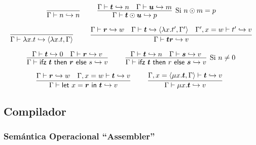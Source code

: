 \documentclass[twoside,a4paper,12pt]{article}
\theoremstyle{definition}
\theoremstyle{remark}
\begin{document}
\begin{equation*}
  \infer[]
    {\Gamma\vdash n \hra n}
    {}
  \qquad
  \infer[\textrm{Si }n\odot m=p]
    {\Gamma\vdash \bm t \odot \bm u \hra p}
    {\Gamma\vdash \bm t \hra n & \Gamma\vdash \bm u \hra m }
\end{equation*}

\begin{equation*}
  \infer[]
    {\Gamma\vdash\fun xt\hra\thunk {\fun xt}\Gamma}
    {}
  \qquad
  \infer
    {\Gamma\vdash \bm{t} \bm{r} \hra v}
    {
      \Gamma\vdash \bm r \hra w
      &\Gamma\vdash \bm t \hra\thunk {\fun x{t'}}{\Gamma'}
      &\Gamma',x=w\vdash t'\hra v
    }
\end{equation*}

\begin{equation*}
  \infer[]
    {\Gamma\vdash \ifz{\bm t}{\bm r}{s}\hra v}
    {
      \Gamma\vdash  \bm t \hra 0
      &\Gamma\vdash \bm r \hra v
    }
    \qquad
    \infer[\textrm{Si }n\neq 0]
      {\Gamma\vdash \ifz{\bm t}{r}{\bm s} \hra v}
      {
        \Gamma\vdash  \bm t \hra n
        &\Gamma\vdash \bm s \hra v
      }
\end{equation*}

\begin{equation*}
  \infer[]
    {\Gamma\vdash\letl{x}{\bm r}{\bm t} \hra v}
    {
      \Gamma\vdash \bm r \hra w
      &\Gamma,x=w\vdash \bm t \hra v
    }
    \qquad
    \infer[]
      {\Gamma \vdash \fix x{\bm t} \hra v}
      {\Gamma,x=\thunk{\fix x{\bm t}}\Gamma\vdash \bm t \hra v}
\end{equation*}

\newpage
\subsection*{Compilador}

\subsubsection*{Semántica Operacional ``Assembler''}
\end{document}
